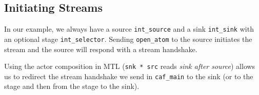 \clearpage

\subsection{Initiating Streams}


In our example, we always have a source \lstinline^int_source^ and a sink
\lstinline^int_sink^ with an optional stage \lstinline^int_selector^. Sending
\lstinline^open_atom^ to the source initiates the stream and the source will
respond with a stream handshake.

Using the actor composition in MTL (\lstinline^snk * src^ reads \emph{sink
after source}) allows us to redirect the stream handshake we send in
\lstinline^caf_main^ to the sink (or to the stage and then from the stage to
the sink).
